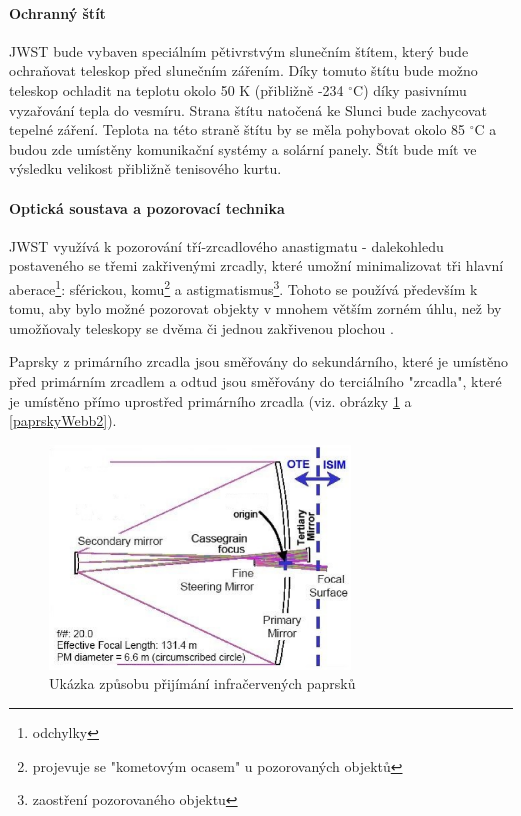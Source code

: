 \documentclass[a4paper,11pt]{article}
\begin{document}
\paragraph{Ochranný štít}
JWST bude vybaven speciálním pětivrstvým slunečním štítem, který bude ochraňovat teleskop před slunečním zářením. Díky tomuto štítu bude možno teleskop ochladit na teplotu okolo 50 K (přibližně -234 $^\circ$C) díky pasivnímu vyzařování tepla do vesmíru. Strana štítu natočená ke Slunci bude zachycovat tepelné záření. Teplota na této straně štítu by se měla pohybovat okolo 85 $^\circ$C a budou zde umístěny komunikační systémy a solární panely. Štít bude mít ve výsledku velikost přibližně tenisového kurtu.

\paragraph{Optická soustava a pozorovací technika}
JWST využívá k pozorování tří-zrcadlového anastigmatu - dalekohledu postaveného se třemi zakřivenými zrcadly, které umožní minimalizovat tři hlavní aberace\footnote{odchylky}: sférickou, komu\footnote{projevuje se "kometovým ocasem" u pozorovaných objektů} a astigmatismus\footnote{zaostření pozorovaného objektu}. Tohoto se používá především k tomu, aby bylo možné pozorovat objekty v mnohem větším zorném úhlu, než by umožňovaly teleskopy se dvěma či jednou zakřivenou plochou \cite{wikipediaAnastigmat}.

Paprsky z primárního zrcadla jsou směřovány do sekundárního, které je umístěno před primárním zrcadlem a odtud jsou směřovány do terciálního "zrcadla", které je umístěno přímo uprostřed primárního zrcadla (viz. obrázky \ref{paprskyWebb} a \ref{paprskyWebb2}).

\begin{figure}[h]
\begin{center}
\includegraphics[width=8cm]{webbPaprsky.eps}
\caption{Ukázka způsobu přijímání infračervených paprsků}
\label{paprskyWebb}
\end{center}
\end{figure}
\end{document}

